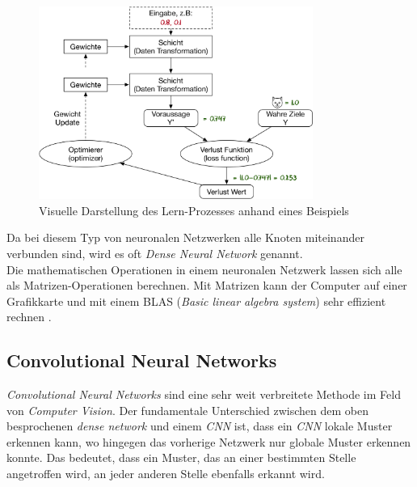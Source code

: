 \begin{figure}[hbt]
	\centering
		\includegraphics[width=0.8\textwidth]{assets/anatomy.png}
	\caption{Visuelle Darstellung des Lern-Prozesses anhand eines Beispiels}
	\label{img:anatomy}
\end{figure}

Da bei diesem Typ von neuronalen Netzwerken alle Knoten miteinander verbunden sind, wird es oft \textit{Dense Neural Network} genannt.
\\
Die mathematischen Operationen in einem neuronalen Netzwerk lassen sich alle als Matrizen-Operationen berechnen. Mit Matrizen kann der Computer auf einer Grafikkarte und mit einem BLAS (\textit{Basic linear algebra system}) sehr effizient rechnen \parencite{neuronale_netze} .


\subsection{Convolutional Neural Networks}
\textit{Convolutional Neural Networks} sind eine sehr weit verbreitete Methode im Feld von \textit{Computer Vision}. Der fundamentale Unterschied zwischen dem oben besprochenen \textit{dense network} und einem \textit{CNN} ist, dass ein \textit{CNN} lokale Muster erkennen kann, wo hingegen das vorherige Netzwerk nur globale Muster erkennen konnte. Das bedeutet, dass ein Muster, das an einer bestimmten Stelle angetroffen wird, an jeder anderen Stelle ebenfalls erkannt wird. \parencite{chollet}

